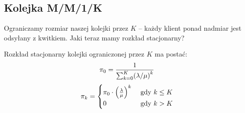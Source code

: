 \subsection{Kolejka M/M/1/K}
Ograniczamy rozmiar naszej kolejki przez \( K \) -- każdy klient ponad nadmiar jest odsyłany z kwitkiem.
Jaki teraz mamy rozkład stacjonarny?

\begin{theorem}[strona 233 P\&C]
	Rozkład stacjonarny kolejki ograniczonej przez \( K \) ma postać:
	\[
		\pi_0 = \frac{1}{\sum_{k=0}^K \pars{\lambda/\mu}^k}
	\]
	\[
		\pi_k = \begin{cases}
			\pi_0 \cdot \left(\frac{\lambda}{\mu}\right)^k & \text{ gdy } k \leq K \\
			0                                        & \text{ gdy } k > K
		\end{cases}
	\]

\end{theorem}

